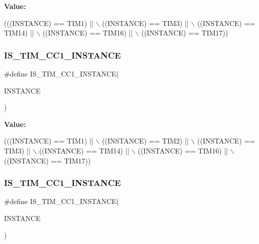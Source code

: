 {\bfseries Value\+:}
\begin{DoxyCode}
(((INSTANCE) == TIM1)    || \(\backslash\)
   ((INSTANCE) == TIM3)    || \(\backslash\)
   ((INSTANCE) == TIM14)   || \(\backslash\)
   ((INSTANCE) == TIM16)   || \(\backslash\)
   ((INSTANCE) == TIM17))
\end{DoxyCode}
\mbox{\label{group___exported__macro_ga0c02efc77b1bfb640d7f6593f58ad464}} 
\subsubsection{\texorpdfstring{I\+S\+\_\+\+T\+I\+M\+\_\+\+C\+C1\+\_\+\+I\+N\+S\+T\+A\+N\+CE}{IS\_TIM\_CC1\_INSTANCE}\hspace{0.1cm}{\footnotesize\ttfamily [4/16]}}
{\footnotesize\ttfamily \#define I\+S\+\_\+\+T\+I\+M\+\_\+\+C\+C1\+\_\+\+I\+N\+S\+T\+A\+N\+CE(\begin{DoxyParamCaption}\item[{}]{I\+N\+S\+T\+A\+N\+CE }\end{DoxyParamCaption})}

{\bfseries Value\+:}
\begin{DoxyCode}
(((INSTANCE) == TIM1)    || \(\backslash\)
   ((INSTANCE) == TIM2)    || \(\backslash\)
   ((INSTANCE) == TIM3)    || \(\backslash\)
   ((INSTANCE) == TIM14)   || \(\backslash\)
   ((INSTANCE) == TIM16)   || \(\backslash\)
   ((INSTANCE) == TIM17))
\end{DoxyCode}
\mbox{\label{group___exported__macro_ga0c02efc77b1bfb640d7f6593f58ad464}} 
\subsubsection{\texorpdfstring{I\+S\+\_\+\+T\+I\+M\+\_\+\+C\+C1\+\_\+\+I\+N\+S\+T\+A\+N\+CE}{IS\_TIM\_CC1\_INSTANCE}\hspace{0.1cm}{\footnotesize\ttfamily [5/16]}}
{\footnotesize\ttfamily \#define I\+S\+\_\+\+T\+I\+M\+\_\+\+C\+C1\+\_\+\+I\+N\+S\+T\+A\+N\+CE(\begin{DoxyParamCaption}\item[{}]{I\+N\+S\+T\+A\+N\+CE }\end{DoxyParamCaption})}

